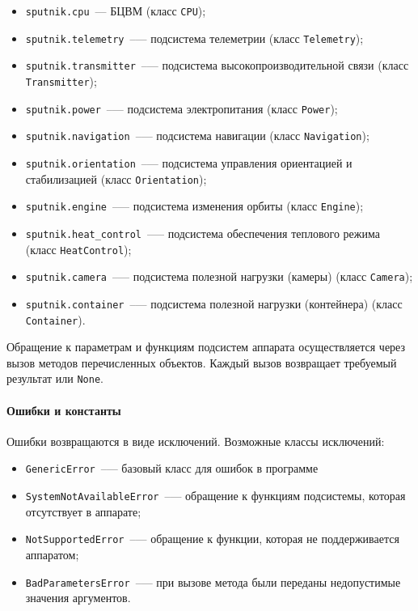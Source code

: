 \documentclass[12pt,a4paper]{article}
\begin{document}
\begin{itemize}
\item \verb'sputnik.cpu'~--- БЦВМ (класс \verb'CPU');
\item \verb'sputnik.telemetry'~--— подсистема телеметрии (класс \verb'Telemetry');
\item \verb'sputnik.transmitter'~--— подсистема высокопроизводительной связи (класс \verb'Transmitter');
\item \verb'sputnik.power'~--— подсистема электропитания (класс \verb'Power');
\item \verb'sputnik.navigation'~--— подсистема навигации (класс \verb'Navigation');
\item \verb'sputnik.orientation'~--— подсистема управления ориентацией и стабилизацией (класс \verb'Orientation');
\item \verb'sputnik.engine'~--— подсистема изменения орбиты (класс \verb'Engine');
\item \verb'sputnik.heat_control'~--— подсистема обеспечения теплового режима (класс \verb'HeatControl');
\item \verb'sputnik.camera'~--— подсистема полезной нагрузки (камеры) (класс \verb'Camera');
\item \verb'sputnik.container'~--— подсистема полезной нагрузки (контейнера) (класс \verb'Container').
\end{itemize}
  
Обращение к параметрам и функциям подсистем аппарата осуществляется через вызов методов
перечисленных объектов. Каждый вызов возвращает требуемый результат или \verb'None'.

\paragraph{Ошибки и константы}

Ошибки возвращаются в виде исключений. Возможные классы исключений:

\begin{itemize}
\item \verb'GenericError'~--— базовый класс для ошибок в программе
\item \verb'SystemNotAvailableError'~--— обращение к функциям подсистемы, которая отсутствует в аппарате;
\item \verb'NotSupportedError'~--— обращение к функции, которая не поддерживается аппаратом;
\item \verb'BadParametersError'~--— при вызове метода были переданы недопустимые значения аргументов.
\end{itemize}
\end{document}

